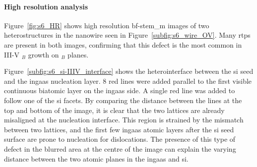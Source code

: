 \paragraph{High resolution analysis} Figure~\ref{fig:s6_HR} shows high resolution \acs{bf}-\acs{stem_m} images of two heterostructures in the nanowire seen in Figure~\ref{subfig:s6_wire_OV}. Many \acs{rtp}s are present in both images, confirming that this defect is the most common in III-V \(_B\) growth on \(_B\) planes. 

Figure~\ref{subfig:s6_si-IIIV_interface} shows the heterointerface between the \acl{si} seed and the \acs{ingaas} nucleation layer. \num{8} red lines were added parallel to the first visible continuous biatomic layer on the \acs{ingaas} side. A single red line was added to follow one of the \acs{si}  facets. By comparing the distance between the lines at the top and bottom of the image, it is clear that the two lattices are already misaligned at the nucleation interface. This region is strained by the mismatch between two lattices, and the first few \acs{ingaas} atomic layers after the \acs{si} seed surface are prone to nucleation for dislocations. The presence of this type of defect in the blurred area at the centre of the image can explain the varying distance between the two  atomic planes in the \acs{ingaas} and \acs{si}.


